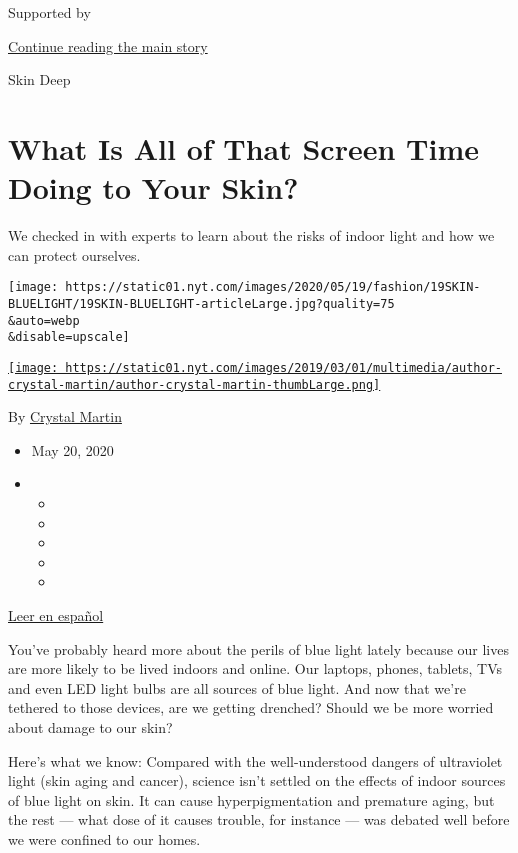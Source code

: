 Supported by

\protect\hyperlink{after-sponsor}{Continue reading the main story}

Skin Deep

\hypertarget{what-is-all-of-that-screen-time-doing-to-your-skin}{%
\section{What Is All of That Screen Time Doing to Your
Skin?}\label{what-is-all-of-that-screen-time-doing-to-your-skin}}

We checked in with experts to learn about the risks of indoor light and
how we can protect ourselves.

\texttt{[image: https://static01.nyt.com/images/2020/05/19/fashion/19SKIN-BLUELIGHT/19SKIN-BLUELIGHT-articleLarge.jpg?quality=75\\\&auto=webp\\\&disable=upscale]}

\href{https://www.nytimes.com/by/crystal-martin}{\texttt{[image: https://static01.nyt.com/images/2019/03/01/multimedia/author-crystal-martin/author-crystal-martin-thumbLarge.png]}}

By \href{https://www.nytimes.com/by/crystal-martin}{Crystal Martin}

\begin{itemize}
\item
  May 20, 2020
\item
  \begin{itemize}
  \item
  \item
  \item
  \item
  \item
  \end{itemize}
\end{itemize}

\href{https://www.nytimes.com/es/2020/05/26/espanol/estilos-de-vida/efectos-luz-pantalla-piel.html}{Leer
en español}

You've probably heard more about the perils of blue light lately because
our lives are more likely to be lived indoors and online. Our laptops,
phones, tablets, TVs and even LED light bulbs are all sources of blue
light. And now that we're tethered to those devices, are we getting
drenched? Should we be more worried about damage to our skin?

Here's what we know: Compared with the well-understood dangers of
ultraviolet light (skin aging and cancer), science isn't settled on the
effects of indoor sources of blue light on skin. It can cause
hyperpigmentation and premature aging, but the rest --- what dose of it
causes trouble, for instance --- was debated well before we were
confined to our homes.

